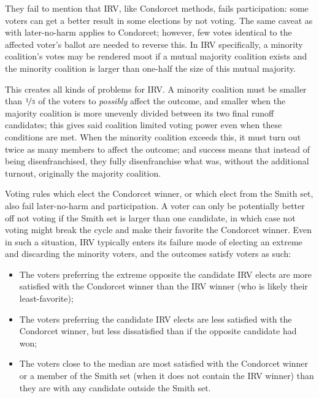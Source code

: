 They fail to mention that IRV, like Condorcet methods, fails participation:  some voters can get a better result in some elections by not voting.  The same caveat as with later-no-harm applies to Condorcet; however, few votes identical to the affected voter's ballot are needed to reverse this.  In IRV specifically, a minority coalition's votes may be rendered moot if a mutual majority coalition exists and the minority coalition is larger than one-half the size of this mutual majority.

This creates all kinds of problems for IRV.  A minority coalition must be smaller than $\nicefrac{1}{3}$ of the voters to \textit{possibly} affect the outcome, and smaller when the majority coalition is more unevenly divided between its two final runoff candidates; this gives said coalition limited voting power even when these conditions are met.  When the minority coalition exceeds this, it must turn out twice as many members to affect the outcome; and success means that instead of being disenfranchised, they fully disenfranchise what was, without the additional turnout, originally the majority coalition.

Voting rules which elect the Condorcet winner, or which elect from the Smith set, also fail later-no-harm and participation.  A voter can only be potentially better off not voting if the Smith set is larger than one candidate, in which case not voting might break the cycle and make their favorite the Condorcet winner.  Even in such a situation, IRV typically enters its failure mode of electing an extreme and discarding the minority voters, and the outcomes satisfy voters as such:

\begin{itemize}
    \item The voters preferring the extreme opposite the candidate IRV elects are more satisfied with the Condorcet winner than the IRV winner (who is likely their least-favorite);

    \item The voters preferring the candidate IRV elects are less satisfied with the Condorcet winner, but less dissatisfied than if the opposite candidate had won;

    \item The voters close to the median are most satisfied with the Condorcet winner or a member of the Smith set (when it does not contain the IRV winner) than they are with any candidate outside the Smith set.
\end{itemize}

